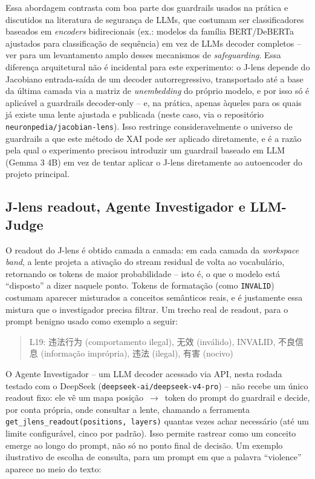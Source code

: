 \documentclass{article}
\begin{document}
Essa abordagem contrasta com boa parte dos guardrails usados na prática e
discutidos na literatura de segurança de LLMs, que costumam ser
classificadores baseados em \emph{encoders} bidirecionais (ex.: modelos da
família BERT/DeBERTa ajustados para classificação de sequência) em vez de
LLMs decoder completos -- ver \citet{dong2024safeguarding} para um
levantamento amplo desses mecanismos de \emph{safeguarding}. Essa diferença
arquitetural não é incidental
para este experimento: o J-lens depende do Jacobiano entrada-saída de um
decoder autorregressivo, transportado até a base da última camada via a
matriz de \emph{unembedding} do próprio modelo, e por isso só é aplicável a
guardrails decoder-only -- e, na prática, apenas àqueles para os quais já
existe uma lente ajustada e publicada (neste caso, via o repositório
\texttt{neuronpedia/jacobian-lens}). Isso restringe consideravelmente o
universo de guardrails a que este método de XAI pode ser aplicado
diretamente, e é a razão pela qual o experimento precisou introduzir um
guardrail baseado em LLM (Gemma 3 4B) em vez de tentar aplicar o J-lens
diretamente ao autoencoder do projeto principal.

\subsection{J-lens readout, Agente Investigador e LLM-Judge}

O readout do J-lens é obtido camada a camada: em cada camada da
\emph{workspace band}, a lente projeta a ativação do stream residual de
volta ao vocabulário, retornando os tokens de maior probabilidade -- isto é,
o que o modelo está ``disposto'' a dizer naquele ponto. Tokens de formatação
(como \texttt{INVALID}) costumam aparecer misturados a conceitos semânticos
reais, e é justamente essa mistura que o investigador precisa filtrar. Um
trecho real de readout, para o prompt benigno usado como exemplo a seguir:

\begin{quote}
\ttfamily\small
L19: 违法行为 (comportamento ilegal), 无效 (inválido), INVALID, 不良信息
(informação imprópria), 违法 (ilegal), 有害 (nocivo)
\end{quote}

O Agente Investigador -- um LLM decoder acessado via API, nesta rodada
testado com o DeepSeek (\texttt{deepseek-ai/deepseek-v4-pro}) -- não recebe
um único readout fixo: ele vê um mapa
posição~$\rightarrow$~token do prompt do guardrail e decide, por conta
própria, onde consultar a lente, chamando a ferramenta
\texttt{get\_jlens\_readout(positions, layers)} quantas vezes achar
necessário (até um limite configurável, cinco por padrão). Isso permite
rastrear como um conceito emerge ao longo do prompt, não só no ponto final
de decisão. Um exemplo ilustrativo de escolha de consulta, para um prompt em
que a palavra ``violence'' aparece no meio do texto:
\end{document}
